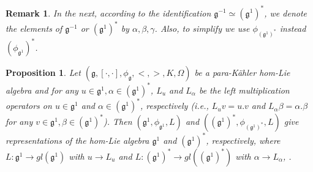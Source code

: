 \documentclass[10pt]{amsart}
\numberwithin{equation}{section}
\newtheorem{proposition}[theorem]{Proposition}
\newtheorem{remark}[theorem]{Remark}
\begin{document}
\begin{remark}
In the next, according to the identification $\mathfrak{g}^{-1}\simeq(\mathfrak{g^1})^*$, we denote the elements of $\mathfrak{g}^{-1}$ or $(\mathfrak{g^1})^*$ by $\alpha, \beta, \gamma$. Also, to simplify we use ${ \phi_{(\mathfrak{g}^1)^*}}$ instead  $(\phi_{\mathfrak{g}^{1}})^*$.
\end{remark}
\begin{proposition}
Let $(\mathfrak{g}, [\cdot, \cdot], \phi_{\mathfrak{g}}, <,>, K,\Omega)$ be a para-K\"{a}hler hom-Lie algebra and for
  any $u\in\mathfrak{g}^1, \alpha\in(\mathfrak{g}^{1})^*$,  $L_u$ and $L_\alpha$ be the left
multiplication operators on $u\in\mathfrak{g}^1$ and $\alpha\in(\mathfrak{g}^{1})^*$, respectively (i.e., $L_uv=u.v$ and $L_\alpha\beta=\alpha.\beta$ for any $v\in\mathfrak{g}^1,\beta\in(\mathfrak{g}^{1})^*$). Then 
$(\mathfrak{g}^1,\phi_{\mathfrak{g}^1},L)$ and $((\mathfrak{g}^1)^*,\phi_{(\mathfrak{g}^1)^*},L)$ give representations of the hom-Lie algebra $\mathfrak{g}^1$ and $(\mathfrak{g}^{1})^*$, respectively, where
$L:\mathfrak{g}^1\rightarrow gl(\mathfrak{g}^1)$ with $u\rightarrow L_u$ and $L:(\mathfrak{g}^1)^*\rightarrow gl((\mathfrak{g}^1)^*)$ with $\alpha\rightarrow L_\alpha$, .  
\end{proposition}
\end{document}
